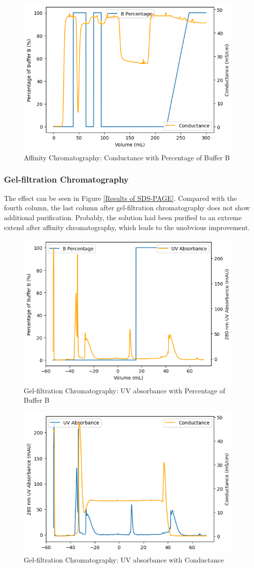 \documentclass{report}
\begin{document}
\begin{figure}
    \centering
    \includegraphics[width=0.6\linewidth]{../Figures/Affinity Column Conductance.png}
    \caption{Affinity Chromatography: Conductance with Percentage of Buffer B}
    \label{Affinity Chromatography: Conductance}
\end{figure}
\subsubsection{Gel-filtration Chromatography}
The effect can be seen in Figure \ref{Results of SDS-PAGE}.
Compared with the fourth column, the last column after gel-filtration chromatography does not show additional purification.
Probably, the solution had been purified to an extreme extend after affinity chromatography, which leads to the unobvious improvement.

\begin{figure}
    \centering
    \includegraphics[width=0.6\linewidth]{../Figures/Filtration Column UV.png}
    \caption{Gel-filtration Chromatography: UV absorbance with Percentage of Buffer B}
    \label{Gel-filtration Chromatography: UV absorbance with Percentage of Buffer B}
\end{figure}

\begin{figure}
    \centering
    \includegraphics[width=0.6\linewidth]{../Figures/Filtration Column UV and Conductance.png}
    \caption{Gel-filtration Chromatography: UV absorbance with Conductance}
    \label{Gel-filtration Chromatography: UV absorbance with Conductace}
\end{figure}
\end{document}
